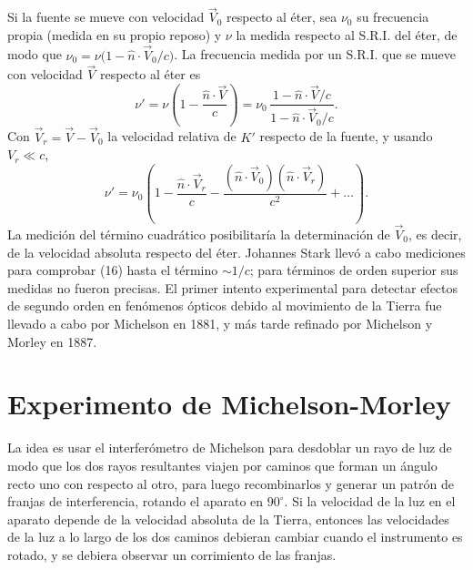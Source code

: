 \begin{observacion}
Si la fuente se mueve con velocidad $\vec V_0$ respecto al éter, sea
$\nu_0$ su frecuencia propia (medida en su propio reposo) y $\nu$ la
medida respecto al S.R.I. del éter, de modo que
$\nu_0=\nu\big(1-\hat n\cdot\vec V_0/c\big)$. La frecuencia medida por un
S.R.I. que se mueve con velocidad $\vec V$ respecto al éter es
\[
\nu' = \nu\left(1-\frac{\hat n\cdot\vec V}{c}\right) = \nu_0\,
\frac{1-\hat n\cdot\vec V/c}{1-\hat n\cdot\vec V_0/c} .
\]
Con $\vec V_r=\vec V-\vec V_0$ la velocidad relativa de $K'$ respecto de
la fuente, y usando $V_r\ll c$,
\[
\nu' = \nu_0\left(1 - \frac{\hat n\cdot\vec V_r}{c} - \frac{(\hat
n\cdot\vec V_0)(\hat n\cdot\vec V_r)}{c^2} + \dots\right). \tag{16}
\]
La medición del término cuadrático posibilitaría la determinación de
$\vec V_0$, es decir, de la velocidad absoluta respecto del éter.
Johannes Stark llevó a cabo mediciones para comprobar (16) hasta el
término $\sim1/c$; para términos de orden superior sus medidas no fueron
precisas. El primer intento experimental para detectar efectos de
segundo orden en fenómenos ópticos debido al movimiento de la Tierra fue
llevado a cabo por Michelson en 1881, y más tarde refinado por Michelson
y Morley en 1887.
\end{observacion}

\section{Experimento de Michelson-Morley}

La idea es usar el interferómetro de Michelson para desdoblar un rayo de
luz de modo que los dos rayos resultantes viajen por caminos que forman
un ángulo recto uno con respecto al otro, para luego recombinarlos y
generar un patrón de franjas de interferencia, rotando el aparato en
$90^\circ$. Si la velocidad de la luz en el aparato depende de la
velocidad absoluta de la Tierra, entonces las velocidades de la luz a lo
largo de los dos caminos debieran cambiar cuando el instrumento es
rotado, y se debiera observar un corrimiento de las franjas.

\begin{center}
\end{center}

